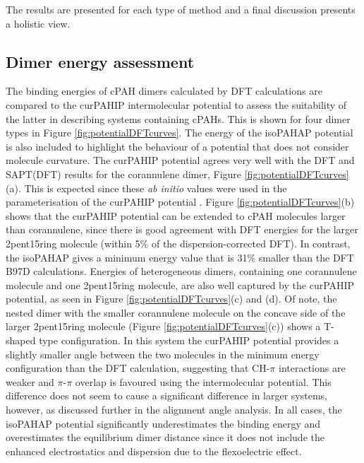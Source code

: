The results are presented for each type of method and a final discussion presents a holistic view.

\subsection{Dimer energy assessment} 

The binding energies of cPAH dimers calculated by DFT calculations are compared to the curPAHIP intermolecular potential to assess the suitability of the latter in describing systems containing cPAHs.  This is shown for four dimer types in Figure \ref{fig:potentialDFTcurves}.  The energy of the isoPAHAP potential is also included to highlight the behaviour of a potential that does not consider molecule curvature.
The curPAHIP potential agrees very well with the DFT and SAPT(DFT) results for the corannulene dimer, Figure \ref{fig:potentialDFTcurves}(a). This is expected since these \textit{ab initio} values were used in the parameterisation of the curPAHIP potential \cite{bowal2019ion}. 
Figure \ref{fig:potentialDFTcurves}(b) shows that the curPAHIP potential can be extended to cPAH molecules larger than corannulene, since there is good agreement with DFT energies for the larger 2pent15ring molecule (within 5\% of the dispersion-corrected DFT). In contrast, the isoPAHAP gives a minimum energy value that is 31\% smaller than the DFT B97D calculations.
Energies of heterogeneous dimers, containing one corannulene molecule and one 2pent15ring molecule, are also well captured by the curPAHIP potential, as seen in Figure \ref{fig:potentialDFTcurves}(c) and (d).  Of note, the nested dimer with the smaller corannulene molecule on the concave side of the larger 2pent15ring molecule (Figure \ref{fig:potentialDFTcurves}(c)) shows a T-shaped type configuration. In this system the curPAHIP potential provides a slightly smaller %
angle between the two molecules in the minimum energy configuration than the DFT calculation, suggesting that CH-$\pi$ interactions are weaker and $\pi$-$\pi$ overlap is favoured using the intermolecular potential.  This difference does not seem to cause a significant difference in larger systems, however, as discussed further in the alignment angle analysis. %
In all cases, the isoPAHAP potential significantly underestimates the binding energy and overestimates the equilibrium dimer distance since it does not include the enhanced electrostatics and dispersion due to the flexoelectric effect.
